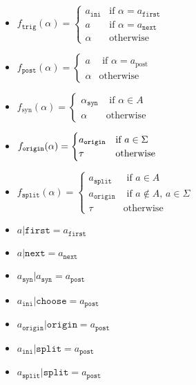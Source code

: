 \documentclass[../hons_project.tex]{subfiles}
\begin{document}
\begin{multicols}{2}
	\begin{itemize}[leftmargin=*]
		\item $f_{\mathtt{trig}}(\alpha) = \begin{cases}
				      a_{\mathtt{ini}} & \text{if } \alpha = a_{\mathtt{first}} \\
				      a                & \text{if } \alpha = a_{\mathtt{next}}  \\
				      \alpha           & \text{otherwise}
			      \end{cases}$

		\item $f_{\mathtt{post}}(\alpha) = \begin{cases}
				      a      & \text{ if } \alpha = a_{\mathrm{post}} \\
				      \alpha & \text{otherwise}
			      \end{cases}$

		\item $f_{\mathrm{syn}}(\alpha) = \begin{cases}
				      \alpha_{\mathtt{syn}} & \text{ if } \alpha\in A \\
				      \alpha                & \text{otherwise}
			      \end{cases}$

		\item $f_{\mathtt{origin}}(\alpha) = \begin{cases}
				      a_{\mathtt{origin}} & \text{if } a\in\Sigma \\
				      \tau                & \text{otherwise}
			      \end{cases}$
		\item $f_{\mathtt{split}}(\alpha) = \begin{cases}
				      a_{\mathtt{split}}  & \text{ if } a\in A                    \\
				      a_{\mathtt{origin}} & \text{ if } a\not\in A,\, a\in \Sigma \\
				      \tau                & \mathrm{otherwise}
			      \end{cases}$
	\end{itemize}
\end{multicols}

\begin{multicols}{3}
	\begin{itemize}[leftmargin=*]
		\item $a | \mathtt{first} = a_{\mathtt{first}}$
		\item $a | \mathtt{next} = a_{\mathtt{next}} $
		\item $a_{\mathtt{syn}} | a_{\mathtt{syn}} = a_{\mathtt{post}}$
		\item $a_{\mathtt{ini}} | \mathtt{choose} = a_{\mathtt{post}}$
		\item $a_{\mathtt{origin}} | \mathtt{origin} = a_{\mathtt{post}}$
		\item $a_{\mathtt{ini}} | \mathtt{split} = a_{\mathtt{post}}$
		\item $a_{\mathtt{split}} | \mathtt{split} = a_{\mathtt{post}}$
	\end{itemize}
\end{multicols}
\end{document}
